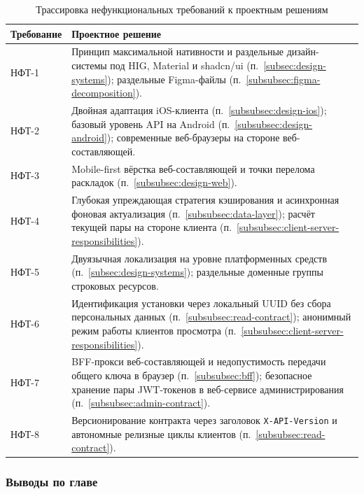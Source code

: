 \begin{table}[h]
  \caption{Трассировка нефункциональных требований к проектным решениям}
  \label{tab:trace-nfr}
  \centering
  \small
  \begin{tabular}{p{} p{}}
    \toprule
    Требование & Проектное решение \\
    \midrule
    НФТ-1  & Принцип максимальной нативности и раздельные дизайн-системы под HIG, Material и shadcn/ui (п.~\ref{subsec:design-systems}); раздельные Figma-файлы (п.~\ref{subsubsec:figma-decomposition}). \\
    НФТ-2  & Двойная адаптация iOS-клиента (п.~\ref{subsubsec:design-ios}); базовый уровень API на Android (п.~\ref{subsubsec:design-android}); современные веб-браузеры на стороне веб-составляющей. \\
    НФТ-3  & Mobile-first вёрстка веб-составляющей и точки перелома раскладок (п.~\ref{subsubsec:design-web}). \\
    НФТ-4  & Глубокая упреждающая стратегия кэширования и асинхронная фоновая актуализация (п.~\ref{subsubsec:data-layer}); расчёт текущей пары на стороне клиента (п.~\ref{subsubsec:client-server-responsibilities}). \\
    НФТ-5  & Двуязычная локализация на уровне платформенных средств (п.~\ref{subsec:design-systems}); раздельные доменные группы строковых ресурсов. \\
    НФТ-6  & Идентификация установки через локальный UUID без сбора персональных данных (п.~\ref{subsubsec:read-contract}); анонимный режим работы клиентов просмотра (п.~\ref{subsubsec:client-server-responsibilities}). \\
    НФТ-7  & BFF-прокси веб-составляющей и недопустимость передачи общего ключа в браузер (п.~\ref{subsubsec:bff}); безопасное хранение пары JWT-токенов в веб-сервисе администрирования (п.~\ref{subsubsec:admin-contract}). \\
    НФТ-8  & Версионирование контракта через заголовок \texttt{X-API-Version} и автономные релизные циклы клиентов (п.~\ref{subsubsec:read-contract}). \\
    \bottomrule
  \end{tabular}
\end{table}

\subsubsection{Выводы по главе}

